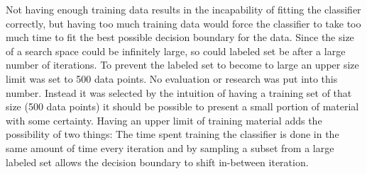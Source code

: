 Not having enough training data results in the incapability of fitting the classifier correctly, but having too much training data would force the classifier to take too much time to fit the best possible decision boundary for the data. Since the size of a search space could be infinitely large, so could labeled set be after a large number of iterations. To prevent the labeled set to become to large an upper size limit was set to 500 data points. No evaluation or research was put into this number. Instead it was selected by the intuition of having a training set of that size (500 data points) it should be possible to present a small portion of material with some certainty. Having an upper limit of training material adds the possibility of two things: The time spent training the classifier is done in the same amount of time every iteration and by sampling a subset from a large labeled set allows the decision boundary to shift in-between iteration.   

